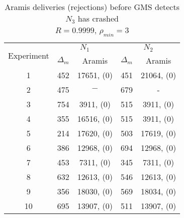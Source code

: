 \begin{table}[p]
    \begin{center}
        \renewcommand{\arraystretch}{1.25}
        \begin{tabular}{|c|c|c|c|c|}
            \hline
            \multirow{2}{*}{Experiment} & \multicolumn{2}{|c|}{$N_1$} & \multicolumn{2}{|c|}{$N_2$} \\ \cline{2-5}
                                                       & $\Delta_m$&\textsf{Aramis} & $\Delta_m$&\textsf{Aramis} \\ \hline \hline
            1 & 452 & 17651, (0) & 451 & 21064, (0) \\ \hline
            2 & 475 & $-$ & 679 & - \\ \hline
            3 & 754 & 3911, (0) & 515 & 3911, (0)  \\ \hline
            4 & 355 & 16516, (0) & 515 & 3911, (0)  \\ \hline
            5 & 214 & 17620, (0) & 503 & 17619, (0)  \\ \hline
            6 & 386 & 12968, (0) & 694 & 12968, (0)  \\ \hline
            7 & 453 & 7311, (0) & 345 & 7311, (0)  \\ \hline
            8 & 632 & 12613, (0) & 546 & 12613, (0)  \\ \hline
            9 & 356 & 18030, (0) & 569 & 18034, (0)  \\ \hline
            10 & 695 & 13907, (0) & 511 & 13907, (0)  \\ \hline
        \end{tabular}
        \caption{\textsf{Aramis} deliveries (rejections) before GMS detects $N_3$ has crashed \\ $R=0.9999$, $\rho_{min}=3$}
        \label{table:crashed_node_rho3}
    \end{center}
\end{table}


